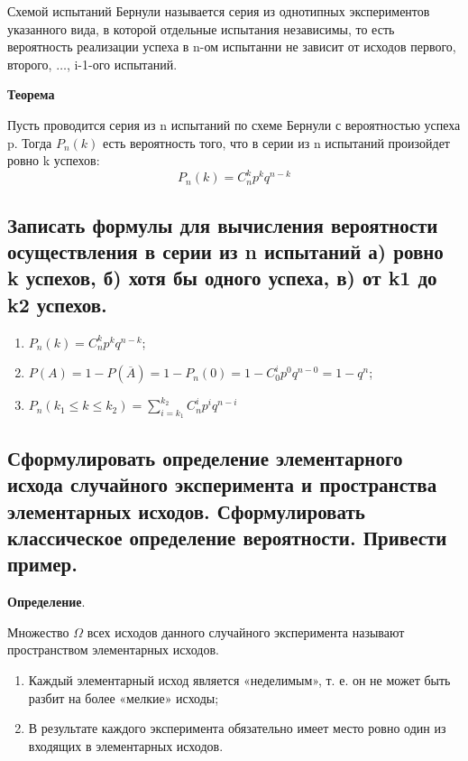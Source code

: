 Схемой испытаний Бернули называется серия из однотипных экспериментов указанного вида, в которой отдельные испытания независимы, то есть вероятность реализации успеха в n-ом испытанни не зависит от исходов первого, второго, $\dots$, i-1-ого испытаний.

\textbf{Теорема}

Пусть проводится серия из n испытаний по схеме Бернули с вероятностью успеха p. Тогда $P_n(k)$ есть вероятность того, что в серии из n испытаний произойдет ровно
k успехов:
\begin{equation}
	P_n(k) = C_n^kp^kq^{n-k}
\end{equation}

\subsection{Записать формулы для вычисления вероятности осуществления в серии из n испытаний а) ровно k успехов, б) хотя бы одного успеха, в) от k1 до k2 успехов.}

\begin{enumerate}
	\item $P_n(k) = C_n^kp^kq^{n-k}$;
	\item $P(A) = 1 - P(\overline{A}) = 1 - P_n(0) = 1 - C_0^ip^0q^{n-0} = 1 - q^n$;
	\item $P_n(k_1 \leqslant k \leqslant k_2) = \sum\limits^{k_2}_{i=k_1} C_n^ip^iq^{n-i}$
\end{enumerate}

\subsection{Сформулировать определение элементарного исхода случайного эксперимента и пространства элементарных исходов. Сформулировать классическое определение вероятности. Привести пример.}

\textbf{Определение}. 

Множество $\Omega$ всех исходов данного случайного эксперимента называют пространством элементарных исходов. 

\begin{enumerate}
	\item Каждый элементарный исход является «неделимым», т. е. он не может быть разбит на более «мелкие» исходы;
	\item В результате каждого эксперимента обязательно имеет место ровно один из входящих в  элементарных исходов.
\end{enumerate}

